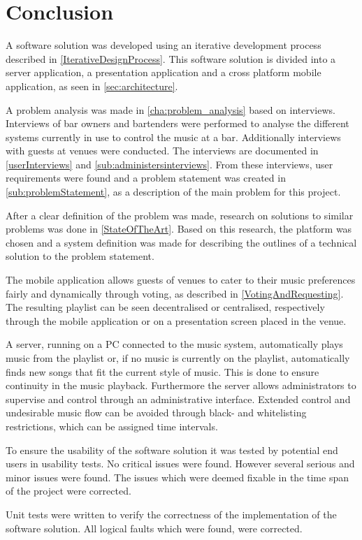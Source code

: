 \chapter{Conclusion}
A software solution was developed using an iterative development process described in \cref{IterativeDesignProcess}. This software solution is divided into a server application, a presentation application and a cross platform mobile application, as seen in \cref{sec:architecture}.

A problem analysis was made in \cref{cha:problem_analysis} based on interviews. Interviews of bar owners and bartenders were performed to analyse the different systems currently in use to control the music at a bar. Additionally interviews with guests at venues were conducted. The interviews are documented in \cref{userInterviews} and \cref{sub:administersinterviews}. From these interviews, user requirements were found and a problem statement was created in \cref{sub:problemStatement}, as a description of the main problem for this project.

After a clear definition of the problem was made, research on solutions to similar problems was done in \cref{StateOfTheArt}. Based on this research, the platform was chosen and a system definition was made for describing the outlines of a technical solution to the problem statement.


The mobile application allows guests of venues to cater to their music preferences fairly and dynamically through voting, as described in \cref{VotingAndRequesting}. The resulting playlist can be seen decentralised or centralised, respectively through the mobile application or on a presentation screen placed in the venue.


A server, running on a PC connected to the music system, automatically plays music from the playlist or, if no music is currently on the playlist, automatically finds new songs that fit the current style of music. This is done to ensure continuity in the music playback. Furthermore the server allows administrators to supervise and control through an administrative interface. Extended control and undesirable music flow can be avoided through black- and whitelisting restrictions, which can be assigned time intervals.


To ensure the usability of the software solution it was tested by potential end users in usability tests. No critical issues were found. However several serious and minor issues were found. The issues which were deemed fixable in the time span of the project were corrected.


Unit tests were written to verify the correctness of the implementation of the software solution. All logical faults which were found, were corrected.

